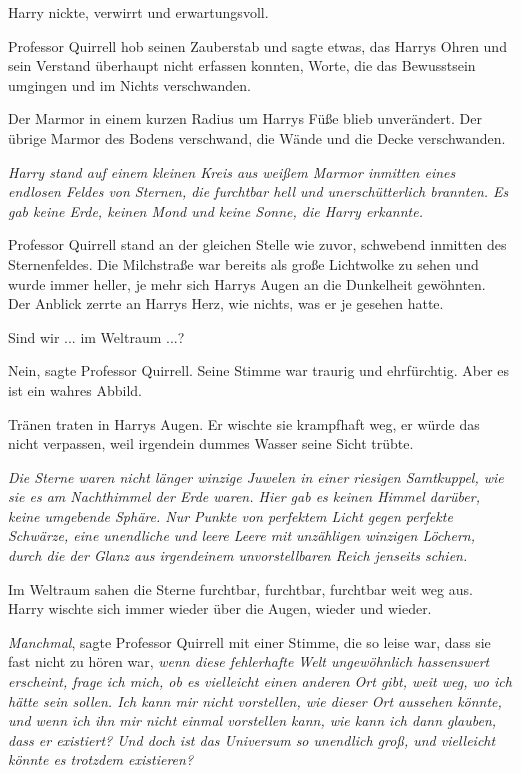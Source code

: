 Harry nickte, verwirrt und erwartungsvoll.

Professor Quirrell hob seinen Zauberstab und sagte etwas, das Harrys Ohren und
sein Verstand überhaupt nicht erfassen konnten, Worte, die das Bewusstsein
umgingen und im Nichts verschwanden.

Der Marmor in einem kurzen Radius um Harrys Füße blieb unverändert. Der übrige
Marmor des Bodens verschwand, die Wände und die Decke verschwanden.

\emph{Harry stand auf einem kleinen Kreis aus weißem Marmor inmitten eines
endlosen Feldes von Sternen, die furchtbar hell und unerschütterlich brannten.
Es gab keine Erde, keinen Mond und keine Sonne, die Harry erkannte. }

Professor Quirrell stand an der gleichen Stelle wie zuvor, schwebend inmitten
des Sternenfeldes. Die Milchstraße war bereits als große Lichtwolke zu sehen und
wurde immer heller, je mehr sich Harrys Augen an die Dunkelheit gewöhnten. Der
Anblick zerrte an Harrys Herz, wie nichts, was er je gesehen hatte.

\glqq Sind wir ... im Weltraum ...?\grqq{}

\glqq Nein\grqq{}, sagte Professor Quirrell. Seine Stimme war traurig und
ehrfürchtig. \glqq Aber es ist ein wahres Abbild.\grqq{}

Tränen traten in Harrys Augen. Er wischte sie krampfhaft weg, er würde das nicht
verpassen, weil irgendein dummes Wasser seine Sicht trübte.

\emph{Die Sterne waren nicht länger winzige Juwelen in einer riesigen
Samtkuppel, wie sie es am Nachthimmel der Erde waren. Hier gab es keinen Himmel
darüber, keine umgebende Sphäre. Nur Punkte von perfektem Licht gegen perfekte
Schwärze, eine unendliche und leere Leere mit unzähligen winzigen Löchern, durch
die der Glanz aus irgendeinem unvorstellbaren Reich jenseits schien.}

Im Weltraum sahen die Sterne furchtbar, furchtbar, furchtbar weit weg aus. Harry
wischte sich immer wieder über die Augen, wieder und wieder.

\glqq \emph{Manchmal}\grqq{}, sagte Professor Quirrell mit einer Stimme, die so
leise war, dass sie fast nicht zu hören war, \glqq \emph{wenn diese fehlerhafte
Welt ungewöhnlich hassenswert erscheint, frage ich mich, ob es vielleicht einen
anderen Ort gibt, weit weg, wo ich }\emph{hätte sein sollen. Ich kann mir nicht
vorstellen, wie dieser Ort aussehen könnte, und wenn ich ihn mir nicht einmal
vorstellen kann, wie kann ich dann glauben, dass er existiert? Und doch ist das
Universum so unendlich groß, und vielleicht könnte es trotzdem existieren? }

